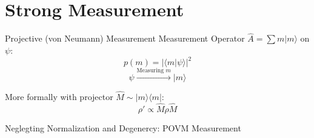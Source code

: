 \documentclass[
]{beamer}
\begin{document}
\section{Strong Measurement}
\begin{frame}{Projective (von Neumann) Measurement}
	Measurement Operator $\hat A = \sum m |m\rangle$ on $\psi$:
	$$p(m) = |\langle m|\psi\rangle|^2$$
	$$\psi \xrightarrow{\text{Measuring }m} |m\rangle$$

	More formally with projector $\hat M \sim |m\rangle\langle m|$:
	$$\rho' \propto \hat M \rho \hat M$$

	{\small\textcolor{seegrau}{
		Neglegting Normalization and Degenercy:
		POVM Measurement
	}}

\end{frame}
\end{document}
